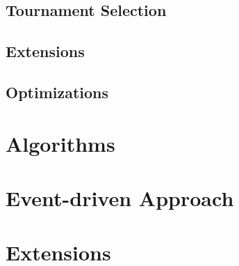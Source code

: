 \subsection{Tournament Selection}
\todo

\subsection{Extensions}
\todo

\subsection{Optimizations}
\todo

\section{Algorithms}
\todo

\section{Event-driven Approach}
\todo

\section{Extensions}
\todo

